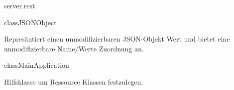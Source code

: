 \begin{texdocpackage}{server.rest}
\begin{texdocclass}{class}{JSONObject}
\label{texdoclet:edu.kit.informatik.studyplan.server.rest.JSONObject}
\begin{texdocclassintro}
Represäntiert einen unmodifizierbaren JSON-Objekt Wert und bietet eine unmodifizierbare Name$/$Werte Zuordnung an.\end{texdocclassintro}
\begin{texdocclassconstructors}
\end{texdocclassconstructors}
\end{texdocclass}


\begin{texdocclass}{class}{MainApplication}
\label{texdoclet:edu.kit.informatik.studyplan.server.rest.MainApplication}
\begin{texdocclassintro}
Hilfsklasse um Ressource Klassen festzulegen.\end{texdocclassintro}
\begin{texdocclassconstructors}
\end{texdocclassconstructors}
\end{texdocclass}



\end{texdocpackage}
